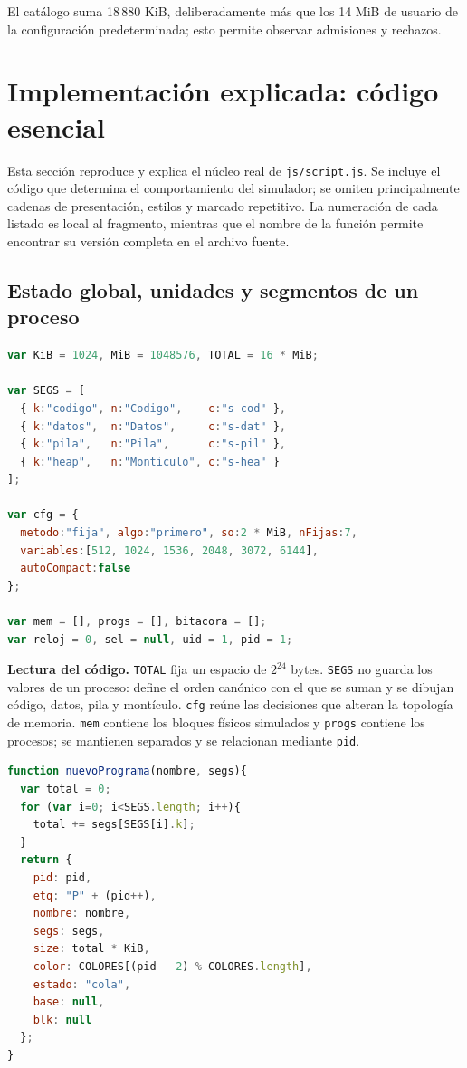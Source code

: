 \documentclass[11pt,a4paper]{article}
\newcommand{\archivo}[1]{\texttt{#1}}
\begin{document}
El catálogo suma 18\,880 KiB, deliberadamente más que los 14 MiB de usuario de la
configuración predeterminada; esto permite observar admisiones y rechazos.

\section{Implementación explicada: código esencial}

Esta sección reproduce y explica el núcleo real de \archivo{js/script.js}. Se
incluye el código que determina el comportamiento del simulador; se omiten
principalmente cadenas de presentación, estilos y marcado repetitivo. La
numeración de cada listado es local al fragmento, mientras que el nombre de la
función permite encontrar su versión completa en el archivo fuente.

\subsection{Estado global, unidades y segmentos de un proceso}

\begin{lstlisting}[language=JavaScript,caption={Unidades, orden de segmentos y configuración inicial.}]
var KiB = 1024, MiB = 1048576, TOTAL = 16 * MiB;

var SEGS = [
  { k:"codigo", n:"Codigo",    c:"s-cod" },
  { k:"datos",  n:"Datos",     c:"s-dat" },
  { k:"pila",   n:"Pila",      c:"s-pil" },
  { k:"heap",   n:"Monticulo", c:"s-hea" }
];

var cfg = {
  metodo:"fija", algo:"primero", so:2 * MiB, nFijas:7,
  variables:[512, 1024, 1536, 2048, 3072, 6144],
  autoCompact:false
};

var mem = [], progs = [], bitacora = [];
var reloj = 0, sel = null, uid = 1, pid = 1;
\end{lstlisting}

\textbf{Lectura del código.} \texttt{TOTAL} fija un espacio de \(2^{24}\) bytes.
\texttt{SEGS} no guarda los valores de un proceso: define el orden canónico con el
que se suman y se dibujan código, datos, pila y montículo. \texttt{cfg} reúne las
decisiones que alteran la topología de memoria. \texttt{mem} contiene los bloques
físicos simulados y \texttt{progs} contiene los procesos; se mantienen separados y
se relacionan mediante \texttt{pid}.

\begin{lstlisting}[language=JavaScript,caption={Creación de un proceso y cálculo de su tamaño.}]
function nuevoPrograma(nombre, segs){
  var total = 0;
  for (var i=0; i<SEGS.length; i++){
    total += segs[SEGS[i].k];
  }
  return {
    pid: pid,
    etq: "P" + (pid++),
    nombre: nombre,
    segs: segs,
    size: total * KiB,
    color: COLORES[(pid - 2) % COLORES.length],
    estado: "cola",
    base: null,
    blk: null
  };
}
\end{lstlisting}
\end{document}
